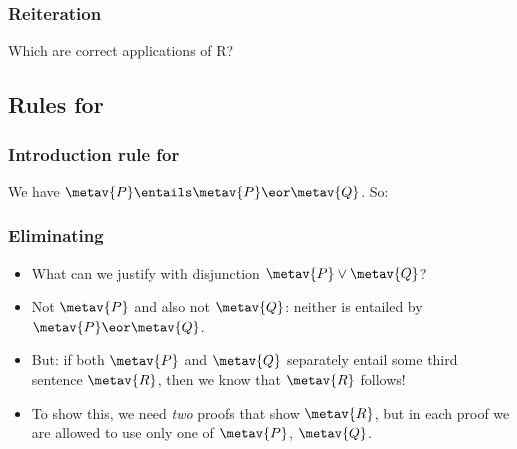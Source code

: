 \begin{frame}
  \frametitle{Reiteration}
Which are correct applications of R?
  \begin{fitchproof}
    \open
    \open
     
    \close
     
     
    \close
     
     
  \end{fitchproof}
\end{frame}

\subsection{Rules for \eor}

\begin{frame}
  \frametitle{Introduction rule for \eor}
  We have $\metav{P} \entails \metav{P} \eor \metav{Q}$. So:
  \begin{fitchproof}
     
  \end{fitchproof}
  \begin{fitchproof}
     
  \end{fitchproof}
\end{frame}

\begin{frame}
  \begin{fitchproof}
    \open
    \close
  \end{fitchproof}
\end{frame}

\begin{frame}
  \frametitle{Eliminating \eor}

  \begin{itemize}[<+->]
  \item What can we justify with disjunction $\metav{P} \lor \metav{Q}$?

  \item Not $\metav{P}$ and also not $\metav{Q}$: neither is entailed by
  $\metav{P} \eor \metav{Q}$.

  \item But: if both $\metav{P}$ and $\metav{Q}$ separately entail some
  third sentence $\metav{R}$, then we know that $\metav{R}$ follows!

  \item To show this, we need \emph{two} proofs that show $\metav{R}$, but
  in each proof we are allowed to use only one of $\metav{P}$, $\metav{Q}$.
  \end{itemize}
\end{frame}

